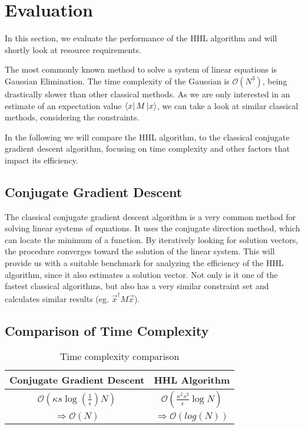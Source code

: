 \section{Evaluation}

\begin{comment}
look at gauß verfahren 
not fastest
look at same constraints 
conjugate gradient descent much faster with similiar requirements
only interested in estimate of $\vec{x}^\dagger M \vec x$
this runs in $ \mathcal{O}(\kappa s log{\left(\frac 1 \epsilon\right)} N ) $
where 
\end{comment}

In this section, we evaluate the performance of the HHL algorithm and will shortly look at resource requirements.

The most commonly known method to solve a system of linear equations is Gaussian Elimination. 
The time complexity of the Gaussian is $\mathcal{O} (N^3)$, being drastically slower than other classical methods.
As we are only interested in an estimate of an expectation value $\bra x M \ket x$, we can take a look at similar classical methods, considering the constraints.

In the following we will compare the HHL algorithm, to the classical conjugate gradient descent algorithm, focusing on time complexity and other factors that impact its efficiency.

\subsection{Conjugate Gradient Descent}
The classical conjugate gradient descent algorithm is a very common method for solving linear systems of equations. 
It uses the conjugate direction method, which can locate the minimum of a function. 
By iteratively looking for solution vectors, the procedure converges toward the solution of the linear system.
This will provide us with a suitable benchmark for analyzing the efficiency of the HHL algorithm, since it also estimates a solution vector.
Not only is it one of the fastest classical algorithms, but also has a very similar constraint set and calculates similar results (eg. $\vec{x}^\dagger M \vec x$).

\subsection{Comparison of Time Complexity }
\begin{table}[htbp]
    \caption{Time complexity comparison}
    \begin{center}
    \begin{tabular}{|c|c|}
    \hline
    \textbf{Conjugate Gradient Descent} & \textbf{HHL Algorithm} \\
    \hline
    $\mathcal{O}(\kappa s \log\left(\frac{1}{\epsilon}\right) N)$  &  $\mathcal{O}\left(\frac{\kappa^2s^2}{\epsilon}\log N\right)$\\
    \hline
    $\Rightarrow \mathcal{O} (N)$ & $\Rightarrow \mathcal{O} (log(N))$\\ 
    \hline
    \end{tabular}
    \end{center}
\end{table}

